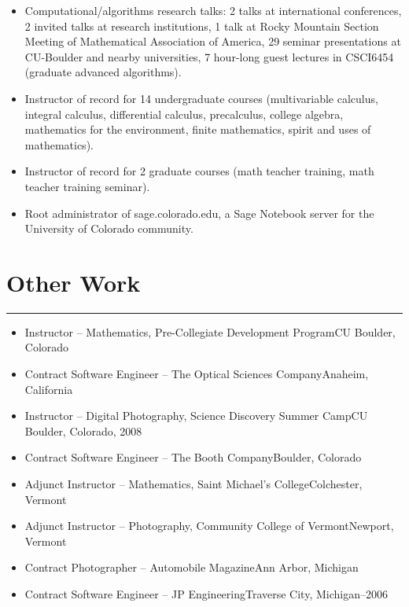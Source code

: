 \documentclass[letterpaper,10pt]{article}
\newcommand{\mblue}{\color{darkblue}}
\begin{document}
\begin{itemize}
\item Computational/algorithms research talks: 2 talks at international conferences, 2 invited talks
at research institutions, 1 talk at Rocky Mountain Section Meeting of Mathematical Association of
America, 29 seminar presentations at CU-Boulder and nearby universities, 7 hour-long guest lectures
in CSCI6454 (graduate advanced algorithms).

\item Instructor of record for 14 undergraduate courses (multivariable calculus,
integral calculus, differential calculus, precalculus, college algebra, mathematics for the
environment, finite mathematics, spirit and uses of mathematics).

\item Instructor of record for 2
graduate courses (math teacher training, math teacher training seminar).

\item Root administrator
of sage.colorado.edu, a Sage Notebook server for the University of Colorado community.
\end{itemize} 


\section*{\mblue Other Work}

\vspace{-2.15pc}
{\hfill\mblue\rule{5.7in}{0.02cm}}

\vspace{1pc}
\begin{itemize}
\item Instructor -- Mathematics, Pre-Collegiate Development Program\hfill CU Boulder, Colorado
\item Contract Software Engineer -- The Optical Sciences Company\hfill Anaheim, California
\item Instructor -- Digital Photography, Science Discovery Summer Camp\hfill CU Boulder,
Colorado, 2008
\item Contract Software Engineer -- The Booth Company\hfill Boulder, Colorado
\item Adjunct Instructor -- Mathematics, Saint Michael's College\hfill Colchester, Vermont
\item Adjunct Instructor -- Photography, Community College of Vermont\hfill Newport, Vermont
\item Contract Photographer -- Automobile Magazine\hfill Ann Arbor, Michigan
\item Contract Software Engineer -- JP Engineering\hfill Traverse City, Michigan--2006
\end{itemize}
\end{document}
